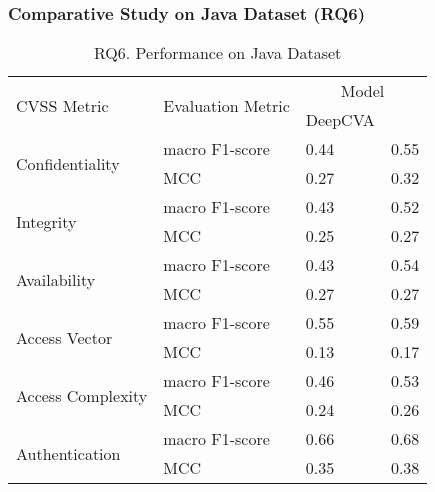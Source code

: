\subsubsection{\bf Comparative Study on Java Dataset (RQ6)}

\begin{table}[t]
	\caption{RQ6. Performance on Java Dataset}
        \vspace{-9pt}
	\begin{center}
        \tabcolsep 2.5pt
\small
		\renewcommand{\arraystretch}{1}
		\begin{tabular}{l|p{2.0cm}<{\centering}|p{1.6cm}<{\centering}|p{1.5cm}<{\centering}}
			\hline
			\multirow{2}{*}{CVSS Metric}     & \multirow{2}{*}{Evaluation Metric}  & \multicolumn{2}{c}{Model}\\
			\cline{3-4}
			&                                     & DeepCVA    & \tool       \\
			\hline
			\multirow{2}{*}{Confidentiality} & macro F1-score                             &     0.44       & 0.55\\
			\cline{2-4}
			& MCC                                 &      0.27      & 0.32\\
			\hline
			\multirow{2}{*}{Integrity}       & macro F1-score                             &    0.43        & 0.52\\
			\cline{2-4}
			& MCC                                 &    0.25        & 0.27\\
			\hline
			\multirow{2}{*}{Availability}    & macro F1-score                             &   0.43         & 0.54\\
			\cline{2-4}
			& MCC                                 &    0.27        & 0.27\\
			\hline
			\multirow{2}{*}{Access Vector}   & macro F1-score                             &   0.55         & 0.59\\
			\cline{2-4}
			& MCC                                 &    0.13        & 0.17\\
			\hline
			\multirow{2}{*}{Access Complexity} & macro F1-score                           &   0.46         & 0.53\\
			\cline{2-4}
			& MCC                                 &    0.24        & 0.26\\
			\hline
			\multirow{2}{*}{Authentication}  & macro F1-score                             &   0.66         & 0.68\\
			\cline{2-4}
			& MCC                                 &   0.35         & 0.38\\

\end{tabular}
\end{center}
\end{table}
